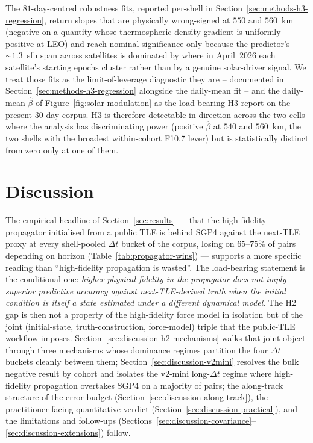 \documentclass[10pt, letterpaper]{article}
\begin{document}
The $81$-day-centred robustness fits, reported per-shell in
Section~\ref{sec:methods-h3-regression}, return slopes that are
physically wrong-signed at $550$ and $560$~km (negative on a quantity
whose thermospheric-density gradient is uniformly positive at LEO)
and reach nominal significance only because the predictor's
$\sim 1.3$~sfu span across satellites is dominated by where in
April~2026 each satellite's starting epochs cluster rather than by a
genuine solar-driver signal. We treat those fits as the
limit-of-leverage diagnostic they are -- documented in
Section~\ref{sec:methods-h3-regression} alongside the
daily-mean fit -- and the daily-mean $\hat\beta$ of
Figure~\ref{fig:solar-modulation} as the load-bearing H3 report on
the present 30-day corpus. H3 is therefore detectable in direction
across the two cells where the analysis has discriminating power
(positive $\hat\beta$ at $540$ and $560$~km, the two shells with the
broadest within-cohort F10.7 lever) but is statistically distinct
from zero only at one of them.

\section{Discussion}
\label{sec:discussion}

The empirical headline of Section~\ref{sec:results} --- that the
high-fidelity propagator initialised from a public TLE is behind
SGP4 against the next-TLE proxy at every shell-pooled $\Delta t$
bucket of the corpus, losing on $65$--$75\%$ of pairs depending on
horizon (Table~\ref{tab:propagator-wins}) --- supports a more
specific reading than ``high-fidelity propagation is wasted''. The
load-bearing statement is the conditional one: \emph{higher
physical fidelity in the propagator does not imply superior
predictive accuracy against next-TLE-derived truth when the initial
condition is itself a state estimated under a different dynamical
model}. The H2 gap is then not a property of the high-fidelity
force model in isolation but of the joint
(initial-state, truth-construction, force-model) triple that the
public-TLE workflow imposes. Section~\ref{sec:discussion-h2-mechanisms}
walks that joint object through three mechanisms whose dominance
regimes partition the four $\Delta t$ buckets cleanly between them;
Section~\ref{sec:discussion-v2mini} resolves the bulk negative
result by cohort and isolates the v2-mini long-$\Delta t$ regime
where high-fidelity propagation overtakes SGP4 on a majority of
pairs; the along-track structure of the error budget
(Section~\ref{sec:discussion-along-track}), the practitioner-facing
quantitative verdict (Section~\ref{sec:discussion-practical}), and
the limitations and follow-ups
(Sections~\ref{sec:discussion-covariance}--\ref{sec:discussion-extensions})
follow.
\end{document}
